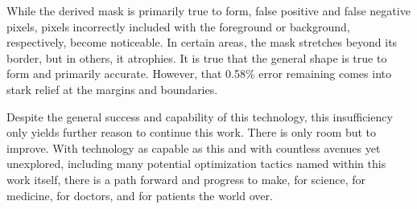\documentclass{article}
\begin{document}
\begin{multicols}{2}
While the derived mask is primarily true to form, false positive and false negative pixels, pixels incorrectly included with the foreground or background, respectively, become noticeable. In certain areas, the mask stretches beyond its border, but in others, it atrophies.  It is true that the general shape is true to form and primarily accurate. However, that 0.58\% error remaining comes into stark relief at the margins and boundaries.

Despite the general success and capability of this technology, this insufficiency only yields further reason to continue this work. There is only room but to improve. With technology as capable as this and with countless avenues yet unexplored, including many potential optimization tactics named within this work itself, there is a path forward and progress to make, for science, for medicine, for doctors, and for patients the world over.

\FloatBarrier

\end{multicols}

\printbibliography
\end{document}
